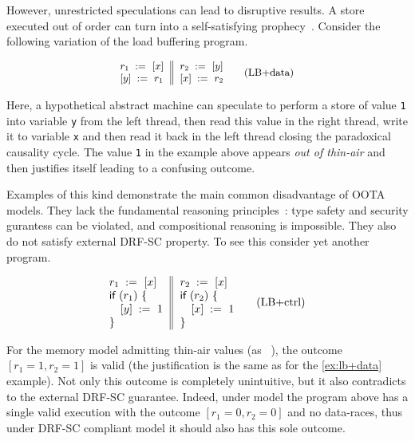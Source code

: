 However, unrestricted speculations can lead to disruptive results. 
A store executed out of order can turn into 
a self-satisfying prophecy~\cite{Boehm-Demsky:MSPC14}.
Consider the following variation of the load buffering program. 

\begin{equation*}
\small
\inarrII{
  \readInst{}{r_1}{x}   \\
  \writeInst{}{y}{r_1}  \\
}{
  \readInst{}{r_2}{y}   \\
  \writeInst{}{x}{r_2}  \\
}
\tag{LB+data}\label{ex:lb+data}
\end{equation*}

Here, a hypothetical abstract machine can speculate 
to perform a store of value \texttt{1} into variable \texttt{y}
from the left thread, then read this value in the right thread, 
write it to variable \texttt{x} and then read it back in the
left thread closing the paradoxical causality cycle.
The value \texttt{1} in the example above appears \emph{out of thin-air}
and then justifies itself leading to a confusing outcome.
 
Examples of this kind demonstrate the main common 
disadvantage of OOTA models.
They lack the fundamental reasoning 
principles~\cite{Boehm-Demsky:MSPC14, Batty-al:ESOP15}:
type safety and security gurantess can be violated, 
and compositional reasoning is impossible.
They also do not satisfy external DRF-SC property.
To see this consider yet another program.

\begin{equation*}
\inarrII{
  \readInst{}{r_1}{x}      \\
  \kw{if} {(r_1)} ~\{      \\
  \quad\writeInst{}{y}{1}  \\
  \}
}{
  \readInst{}{r_2}{x}      \\
  \kw{if} {(r_2)} ~\{      \\
  \quad\writeInst{}{x}{1}  \\
  \}
}
\tag{LB+ctrl}\label{ex:lb+ctrl}
\end{equation*}

For the memory model admitting thin-air values 
(as \eg \CMM~\cite{Batty-al:POPL11}), 
the outcome $[r_1=1, r_2=1]$ is valid
(the justification is the same as for the \ref{ex:lb+data} example).
Not only this outcome is completely unintuitive,
but it also contradicts to the external DRF-SC guarantee.
Indeed, under \SC model the program above has 
a single valid execution with the outcome $[r_1=0, r_2=0]$ 
and no data-races, thus under DRF-SC compliant model 
it should also has this sole outcome.  

